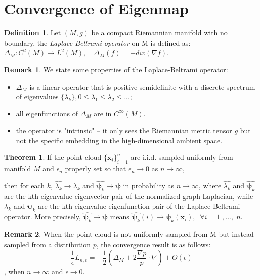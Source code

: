 \documentclass[11pt]{article}
\theoremstyle{definition}
\newtheorem{definition}{Definition}
\newtheorem{remark}{Remark}
\newtheorem{theorem}{Theorem}
\begin{document}
\section{Convergence of Eigenmap}
\begin{definition}
Let $(M, g)$ be a compact Riemannian manifold with no boundary, the \textit{Laplace-Beltrami operator} on M is defined as: $\Delta_M: C^2(M) \rightarrow L^2(M),\quad \Delta_M(f) = -div(\nabla f)$.
\end{definition}
\begin{remark}
We state some properties of the Laplace-Beltrami operator:
\begin{itemize}
\item $\Delta_M$ is a linear operator that is positive semidefinite with a discrete spectrum of eigenvalues $\{\lambda_k\}, 0 \leq \lambda_1 \leq \lambda_2 \leq ... $;
\item all eigenfunctions of $\Delta_M$ are in $C^\infty(M)$.
\item the operator is "intrinsic" -- it only sees the Riemannian metric tensor $g$ but not the specific embedding in the high-dimensional ambient space.
\end{itemize}
\end{remark}
\begin{theorem}\cite{belkin2007convergence}
If the point cloud $\{\mathbf{x}_i\}_{i=1}^n$ are i.i.d. sampled uniformly from manifold $M$ and $\epsilon_n$ properly set so that $\epsilon_n \to 0$ as $n \to \infty$,

\medskip
then for each $k$,
$\widehat{\lambda_{k}} \rightarrow \lambda_{k}$ and $\widehat{\boldsymbol{\psi}_k} \rightarrow \boldsymbol{\psi}$ in probability as $n \to \infty$, where $\widehat{\lambda_{k}}$ and $\widehat{\boldsymbol{\psi}_k}$ are the kth eigenvalue-eigenvector pair of the normalized graph Laplacian, while $\lambda_{k}$ and $\boldsymbol{\psi}_k$ are the kth eigenvalue-eigenfunction pair of the Laplace-Beltrami operator. More precisely, $\widehat{\boldsymbol{\psi}_k} \rightarrow \boldsymbol{\psi}$ means $\widehat{\boldsymbol{\psi}_k}(i) \rightarrow \boldsymbol{\psi}_k(\boldsymbol{x}_i), \;\; \forall i=1 \; ,...,\; n$.
\end{theorem}
\begin{remark}
When the point cloud is not uniformly sampled from M but instead sampled from a distribution $p$, the convergence result is as follows:
\begin{equation}
\frac{1}{\epsilon} L_{n,\epsilon} = -\frac{1}{2}(\Delta_M + 2\frac{\nabla p}{p} \cdot \nabla) + O(\epsilon)
\end{equation}, when $n\rightarrow \infty$ and $\epsilon \rightarrow 0$.
\end{remark}
\end{document}
